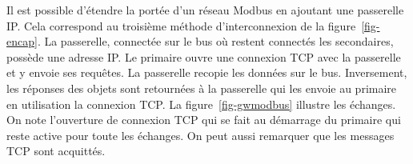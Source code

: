 \documentclass[11pt,fleqn]{book} %
\begin{document}
Il est possible d'étendre la portée d'un réseau Modbus en ajoutant une passerelle IP. Cela correspond au troisième méthode d'interconnexion de la figure~\vref{fig-encap}. La passerelle, connectée sur le bus où restent connectés les secondaires, possède une adresse IP. Le primaire ouvre une connexion TCP avec la passerelle et y envoie ses requêtes. La passerelle recopie les données sur le bus. Inversement, les réponses des objets sont retournées à la passerelle qui les envoie au primaire en utilisation la connexion TCP. La figure~\vref{fig-gwmodbus} illustre les échanges. On note l'ouverture de connexion TCP qui se fait au démarrage du primaire qui reste active pour toute les échanges. On peut aussi remarquer que les messages TCP sont acquittés.

\begin{figure}
    \centering
    
\end{figure}
\end{document}
